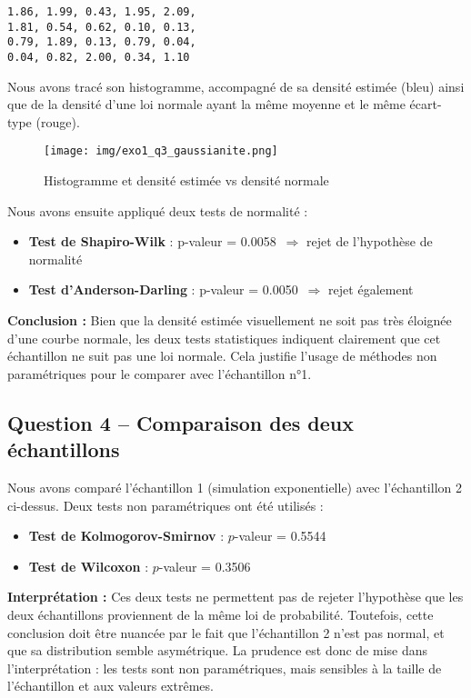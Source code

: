 \documentclass[a4paper,11pt]{article}
\begin{document}
\begin{verbatim}
1.86, 1.99, 0.43, 1.95, 2.09,
1.81, 0.54, 0.62, 0.10, 0.13,
0.79, 1.89, 0.13, 0.79, 0.04,
0.04, 0.82, 2.00, 0.34, 1.10
\end{verbatim}

Nous avons tracé son histogramme, accompagné de sa densité estimée (bleu) ainsi que de la densité d’une loi normale ayant la même moyenne et le même écart-type (rouge).

\begin{figure}[H]
    \centering
    \texttt{[image: img/exo1\_q3\_gaussianite.png]}
    \caption{Histogramme et densité estimée vs densité normale}
\end{figure}

Nous avons ensuite appliqué deux tests de normalité :
\begin{itemize}
    \item \textbf{Test de Shapiro-Wilk} : p-valeur = 0.0058~$\Rightarrow$ rejet de l’hypothèse de normalité
    \item \textbf{Test d’Anderson-Darling} : p-valeur = 0.0050~$\Rightarrow$ rejet également
\end{itemize}

\textbf{Conclusion :} Bien que la densité estimée visuellement ne soit pas très éloignée d’une courbe normale, les deux tests statistiques indiquent clairement que cet échantillon ne suit pas une loi normale. Cela justifie l’usage de méthodes non paramétriques pour le comparer avec l’échantillon n°1.

\subsection*{Question 4 – Comparaison des deux échantillons}
Nous avons comparé l’échantillon 1 (simulation exponentielle) avec l’échantillon 2 ci-dessus. Deux tests non paramétriques ont été utilisés :
\begin{itemize}
    \item \textbf{Test de Kolmogorov-Smirnov} : $p$-valeur = 0.5544
    \item \textbf{Test de Wilcoxon} : $p$-valeur = 0.3506
\end{itemize}

\textbf{Interprétation :} Ces deux tests ne permettent pas de rejeter l’hypothèse que les deux échantillons proviennent de la même loi de probabilité. Toutefois, cette conclusion doit être nuancée par le fait que l’échantillon 2 n’est pas normal, et que sa distribution semble asymétrique. La prudence est donc de mise dans l’interprétation : les tests sont non paramétriques, mais sensibles à la taille de l’échantillon et aux valeurs extrêmes.
\end{document}
